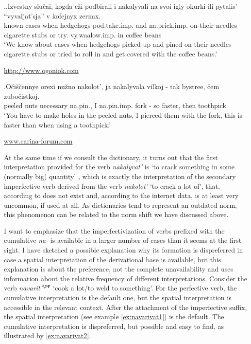 \ex.\label{ex:nakalyvat}\ag.Izvestny slu\v{c}ai, kogda e\v{z}i podbirali i nakalyvali na svoi igly okurki ili pytalis' ``vyvaljat'sja'' v kofejnyx zernax.\\
known cases when hedgehogs pod.take.imp. and na.prick.imp. on their needles {cigarette stubs} or try. vy.waalow.imp. in coffee beans\\
\vspace{0.5em}
`We know about cases when hedgehogs picked up and pined on their needles cigarette stubs or tried to roll in and get covered with the coffee beans.'
\begin{flushright}
\vspace{-0.5em}
\url{http://www.ogoniok.com}
\end{flushright}
\bg.O\v{c}i\v{s}\v{c}ennye orexi nu\v{z}no nakolot', ja nakalyvala vilkoj - tak bystree, \v{c}em zubo\v{c}istkoj.\\
peeled nuts necessary na.pin., I na.pin.imp. fork - so faster, then toothpick\\
\vspace{0.5em}
`You have to make holes in the peeled nuts, I pierced them with the fork, this is faster than when using a toothpick.'
\begin{flushright}
\vspace{-0.5em}
\url{www.carina-forum.com}
\end{flushright}

At the same time if we consult the dictionary, it turns out that the first interpretation provided for the verb \textit{nakalyvat'} is `to crack something in some (normally big) quantity' \citep{Efremova:00}, which is exactly the interpretation of the secondary imperfective verb derived from the verb \textit{nakolot'} `to crack a lot of', that, according to \citet{Svenonius:04b} does not exist and, according to the internet data, is at least very uncommon, if used at all. As dictionaries tend to represent an outdated norm, this phenomenon can be related to the norm shift we have discussed above.

I want to emphasize that the imperfectivization of verbs prefixed with the cumulative \textit{na-} is available in a larger number of cases than it seems at the first sight. I have sketched a possible explanation why its formation is dispreferred in case a spatial interpretation of the derivational base is available, but this explanation is about the preference, not the complete unavailability and uses information about the relative frequency of different interpretations. Consider the verb \textit{navarit'$^{\PF}$} `cook a lot/to weld to something'. For the perfective verb, the cumulative interpretation is the default one, but the spatial interpretation is accessible in the relevant context. After the attachment of the imperfective suffix, the spatial interpretation (see example \ref{ex:navarivat1}) is the default. The cumulative interpretation is dispreferred, but possible and easy to find, as illustrated by \ref{ex:navarivat2}.

